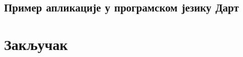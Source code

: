 \documentclass[12pt,oneside]{memoir}
\begin{document}
\section{Пример апликације у програмском језику Дарт}
\label{sec:aplikacija}


\chapter{Закључак}




\literatura

\backmatter


\end{document}
